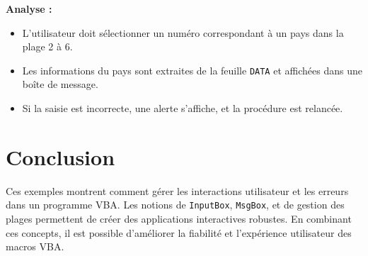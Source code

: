 \documentclass[a4paper,12pt]{report}
\begin{document}
\textbf{Analyse :}
\begin{itemize}
	\item L'utilisateur doit sélectionner un numéro correspondant à un pays dans la plage 2 à 6.
	\item Les informations du pays sont extraites de la feuille \texttt{DATA} et affichées dans une boîte de message.
	\item Si la saisie est incorrecte, une alerte s'affiche, et la procédure est relancée.
\end{itemize}

\section{Conclusion}

Ces exemples montrent comment gérer les interactions utilisateur et les erreurs dans un programme VBA. Les notions de \texttt{InputBox}, \texttt{MsgBox}, et de gestion des plages permettent de créer des applications interactives robustes. En combinant ces concepts, il est possible d'améliorer la fiabilité et l'expérience utilisateur des macros VBA.
	
\end{document}
